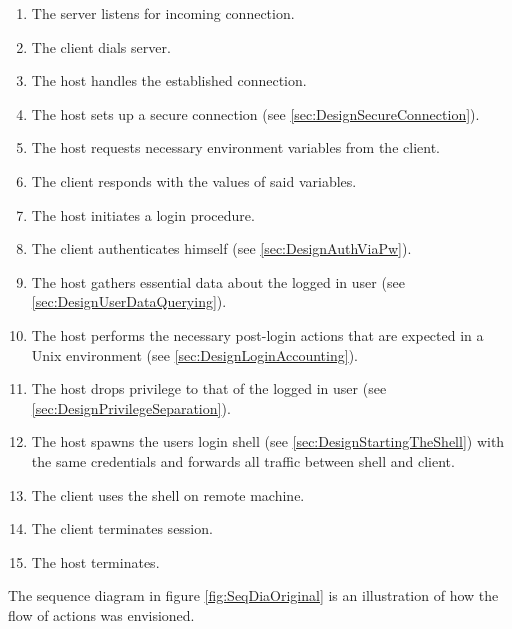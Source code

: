 \documentclass[10pt,a4paper,titlepage,twoside,english,final]{zhawreprt}
\begin{document}
\begin{enumerate}
\item The server listens for incoming connection.
\item The client dials server.
\item The host handles the established connection.
\item The host sets up a secure connection (see \ref{sec:DesignSecureConnection}).
\item The host requests necessary environment variables from the client.
\item The client responds with the values of said variables.
\item The host initiates a \gls{login} procedure.
\item The client authenticates himself (see \ref{sec:DesignAuthViaPw}).
\item The host gathers essential data about the logged in user (see \ref{sec:DesignUserDataQuerying}).
\item The host performs the necessary post-\gls{login} actions that are expected in a \gls{Unix} environment (see \ref{sec:DesignLoginAccounting}).
\item The host drops privilege to that of the logged in user (see \ref{sec:DesignPrivilegeSeparation}).
\item The host spawns the users \gls{login} \gls{shell} (see \ref{sec:DesignStartingTheShell}) with the same credentials and forwards all traffic between \gls{shell} and client.
\item The client uses the \gls{shell} on remote machine.
\item The client terminates session.
\item The host terminates.
\end{enumerate}

The sequence diagram in figure \ref{fig:SeqDiaOriginal} is an illustration of how the flow of actions was envisioned.
\end{document}
